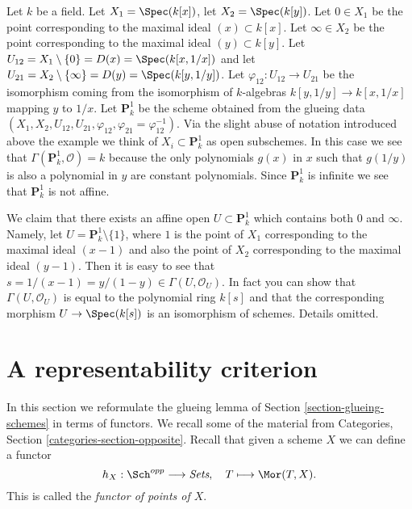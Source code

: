 \begin{example}
\label{example-projective-line}
Let $k$ be a field.
Let $X_1 = \Spec(k[x])$,
let $X_2 = \Spec(k[y])$.
Let $0 \in X_1$ be the point corresponding to the maximal ideal
$(x) \subset k[x]$.
Let $\infty \in X_2$ be the point corresponding to the maximal ideal
$(y) \subset k[y]$.
Let $U_{12} = X_1 \setminus \{0\} = D(x) = \Spec(k[x, 1/x])$ and
let $U_{21} = X_2 \setminus \{\infty\} = D(y) = \Spec(k[y, 1/y])$.
Let $\varphi_{12} : U_{12} \to U_{21}$ be the isomorphism
coming from the isomorphism of $k$-algebras
$k[y, 1/y] \to k[x, 1/x]$ mapping $y$ to $1/x$.
Let $\mathbf{P}^1_k$ be the scheme obtained from the glueing data
$(X_1, X_2, U_{12}, U_{21}, \varphi_{12},
\varphi_{21} = \varphi_{12}^{-1})$. Via the slight abuse
of notation introduced above the example we think of
$X_i \subset \mathbf{P}^1_k$ as open subschemes. In this case
we see that $\Gamma(\mathbf{P}^1_k, \mathcal{O}) = k$ because the
only polynomials $g(x)$ in $x$ such that $g(1/y)$ is
also a polynomial in $y$ are constant polynomials.
Since $\mathbf{P}^1_k$ is infinite we see that $\mathbf{P}^1_k$ is not affine.

\medskip\noindent
We claim that there exists an affine open $U \subset \mathbf{P}^1_k$
which contains both $0$ and $\infty$. Namely, let
$U = \mathbf{P}^1_k \setminus \{1\}$, where $1$ is the point
of $X_1$ corresponding to the maximal ideal $(x - 1)$
and also the point of $X_2$ corresponding to the
maximal ideal $(y - 1)$. Then it is easy to see that
$s = 1/(x - 1) = y/(1 - y) \in \Gamma(U, \mathcal{O}_U)$.
In fact you can show that $\Gamma(U, \mathcal{O}_U)$
is equal to the polynomial ring $k[s]$ and that the
corresponding morphism $U \to \Spec(k[s])$ is
an isomorphism of schemes. Details omitted.
\end{example}




\section{A representability criterion}
\label{section-representable}

\noindent
In this section we reformulate the glueing lemma
of Section \ref{section-glueing-schemes} in terms
of functors. We recall some of the material from
Categories, Section \ref{categories-section-opposite}.
Recall that given a scheme $X$ we
can define a functor
$$
h_X : \Sch^{opp}
\longrightarrow
\textit{Sets}, \quad
T \longmapsto \Mor(T, X).
$$
This is called the {\it functor of points of $X$}.

